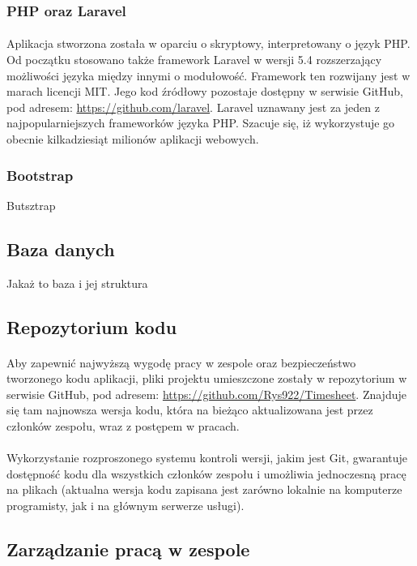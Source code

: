 \documentclass[a4paper, 12pt, oneside]{article}
\begin{document}
			\subsubsection{PHP oraz Laravel}
				\paragraph{} Aplikacja stworzona została w oparciu o skryptowy, interpretowany o język PHP. Od początku stosowano także framework Laravel w wersji 5.4 rozszerzający możliwości języka między innymi o modułowość. Framework ten rozwijany jest w marach licencji MIT. Jego kod źródłowy pozostaje dostępny w serwisie GitHub, pod adresem: \url{https://github.com/laravel}. Laravel uznawany jest za jeden z najpopularniejszych frameworków języka PHP. Szacuje się, iż wykorzystuje go obecnie kilkadziesiąt milionów aplikacji webowych.
			\subsubsection{Bootstrap}
				Butsztrap
		\subsection{Baza danych}
			Jakaż to baza i jej struktura
		\subsection{Repozytorium kodu}
			\paragraph{}Aby zapewnić najwyższą wygodę pracy w zespole oraz bezpieczeństwo tworzonego kodu aplikacji, pliki projektu umieszczone zostały w repozytorium w serwisie GitHub, pod adresem:  \url{https://github.com/Rys922/Timesheet}. Znajduje się tam najnowsza wersja kodu, która na bieżąco aktualizowana jest przez członków zespołu, wraz z postępem w pracach.
			\paragraph{} Wykorzystanie rozproszonego systemu kontroli wersji, jakim jest Git, gwarantuje dostępność kodu dla wszystkich członków zespołu i umożliwia jednoczesną pracę na plikach (aktualna wersja kodu zapisana jest zarówno lokalnie na komputerze programisty, jak i na głównym serwerze usługi).
			\subsection{Zarządzanie pracą w zespole}
\end{document}
